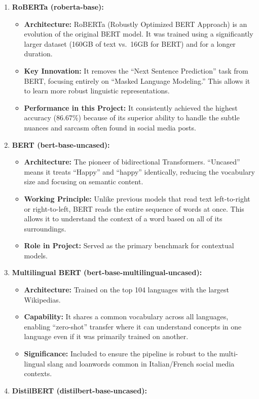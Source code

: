 \documentclass[
]{article}
\providecommand{\tightlist}{%
  \setlength{\itemsep}{0pt}\setlength{\parskip}{0pt}}
\begin{document}
\begin{enumerate}
\def\labelenumi{\arabic{enumi}.}
\tightlist
\item
  \textbf{RoBERTa (roberta-base):}

  \begin{itemize}
  \tightlist
  \item
    \textbf{Architecture:} RoBERTa (Robustly Optimized BERT Approach) is
    an evolution of the original BERT model. It was trained using a
    significantly larger dataset (160GB of text vs.~16GB for BERT) and
    for a longer duration.
  \item
    \textbf{Key Innovation:} It removes the ``Next Sentence Prediction''
    task from BERT, focusing entirely on ``Masked Language Modeling.''
    This allows it to learn more robust linguistic representations.
  \item
    \textbf{Performance in this Project:} It consistently achieved the
    highest accuracy (86.67\%) because of its superior ability to handle
    the subtle nuances and sarcasm often found in social media posts.
  \end{itemize}
\item
  \textbf{BERT (bert-base-uncased):}

  \begin{itemize}
  \tightlist
  \item
    \textbf{Architecture:} The pioneer of bidirectional Transformers.
    ``Uncased'' means it treats ``Happy'' and ``happy'' identically,
    reducing the vocabulary size and focusing on semantic content.
  \item
    \textbf{Working Principle:} Unlike previous models that read text
    left-to-right or right-to-left, BERT reads the entire sequence of
    words at once. This allows it to understand the context of a word
    based on all of its surroundings.
  \item
    \textbf{Role in Project:} Served as the primary benchmark for
    contextual models.
  \end{itemize}
\item
  \textbf{Multilingual BERT (bert-base-multilingual-uncased):}

  \begin{itemize}
  \tightlist
  \item
    \textbf{Architecture:} Trained on the top 104 languages with the
    largest Wikipedias.
  \item
    \textbf{Capability:} It shares a common vocabulary across all
    languages, enabling ``zero-shot'' transfer where it can understand
    concepts in one language even if it was primarily trained on
    another.
  \item
    \textbf{Significance:} Included to ensure the pipeline is robust to
    the multi-lingual slang and loanwords common in Italian/French
    social media contexts.
  \end{itemize}
\item
  \textbf{DistilBERT (distilbert-base-uncased):}


\end{enumerate}
\end{document}
